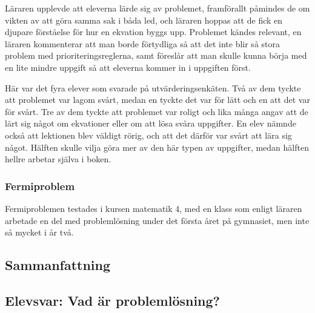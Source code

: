         \textcolor{lila}{Läraren upplevde att eleverna lärde sig av problemet, framförallt påmindes de om vikten av att göra samma sak i båda led, och läraren hoppas att de fick en djupare förståelse för hur en ekvation byggs upp. Problemet kändes relevant, en läraren kommenterar att man borde förtydliga så att det inte blir så stora problem med prioriteringsreglerna, samt föreslår att man skulle kunna börja med en lite mindre  uppgift så att eleverna kommer in i uppgiften först.}
        
        \textcolor{lila}{Här var det fyra elever som svarade på utvärderingsenkäten. Två av dem tyckte att problemet var lagom svårt, medan en tyckte det var för lätt och en att det var för svårt.  Tre av dem tyckte att problemet var roligt och lika många angav att de lärt sig något om ekvationer eller om att lösa svåra uppgifter. En elev nämnde också att lektionen blev väldigt rörig, och att det därför var svårt att lära sig något. Hälften skulle vilja göra mer av den här typen av uppgifter, medan hälften hellre arbetar själva i boken.}
        
    \subsubsection{Fermiproblem}
        Fermiproblemen testades i kursen matematik 4, med en klass som enligt läraren arbetade en del med problemlösning under det första året på gymnasiet, men inte så mycket i år två.

    
\subsection{Sammanfattning}

\subsection{Elevsvar: Vad är problemlösning?}


